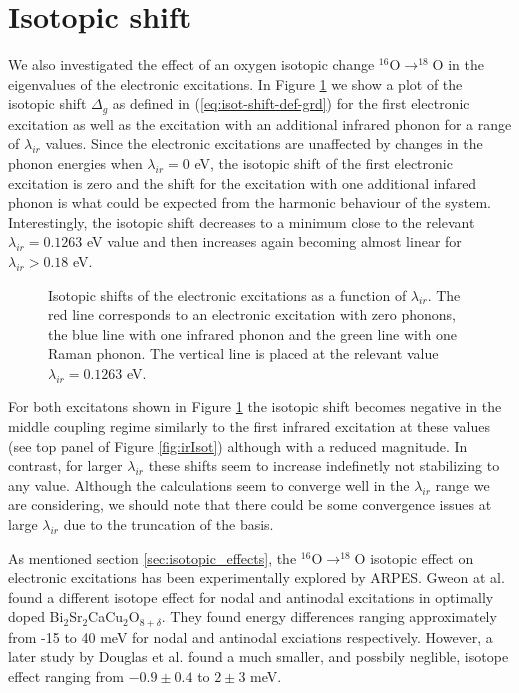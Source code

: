 \section{Isotopic shift}
\label{sec:elIsotShift}

We also investigated the effect of an oxygen isotopic change $^{16}$O$\rightarrow ^{18}$O in the eigenvalues of the electronic excitations.
In Figure \ref{fig:electrIsot} we show a plot of the isotopic shift $\Delta_g$ as defined in (\ref{eq:isot-shift-def-grd}) for the first electronic excitation as well as the excitation with an additional infrared phonon for a range of $\lambda_{ir}$ values.
Since the electronic excitations are unaffected by changes in the phonon energies when $\lambda_{ir}=0$ eV, the isotopic shift of the first electronic excitation is zero and the shift for the excitation with one additional infared phonon is what could be expected from the harmonic behaviour of the system.
Interestingly, the isotopic shift decreases to a minimum close to the relevant $\lambda_{ir}=0.1263$ eV value and then increases again becoming almost linear for $\lambda_{ir}>0.18$ eV.
%
\begin{figure}[ht]
  \centering
  
  \caption[Isotopic shift of the electronic excitations as a function of $\lambda_{ir}$.]
  {Isotopic shifts of the electronic excitations as a function of $\lambda_{ir}$. 
    The red line corresponds to an electronic excitation with zero phonons, the blue line with one infrared phonon and the green line with one Raman phonon.
    The vertical line is placed at the relevant value $\lambda_{ir}=0.1263$ eV.}
  \label{fig:electrIsot}
\end{figure}

For both excitatons shown in Figure \ref{fig:electrIsot} the isotopic shift becomes negative in the middle coupling regime similarly to the first infrared excitation at these values (see top panel of Figure \ref{fig:irIsot}) although with a reduced magnitude.
In contrast, for larger $\lambda_{ir}$ these shifts seem to increase indefinetly not stabilizing to any value.
Although the calculations seem to converge well in the $\lambda_{ir}$ range we are considering, we should note that there could be some convergence issues at large $\lambda_{ir}$ due to the truncation of the basis.

As mentioned section \ref{sec:isotopic_effects}, the $^{16}$O$\rightarrow ^{18}$O isotopic effect on electronic excitations has been experimentally explored by ARPES.
Gweon at al. \cite{Gweon2004} found a different isotope effect for nodal and antinodal excitations in optimally doped Bi$_2$Sr$_2$CaCu$_2$O$_{8+\delta}$. 
They found energy differences ranging approximately from -15 to 40 meV for nodal and antinodal exciations respectively.
However, a later study by Douglas et al. \cite{Douglas2007} found a much smaller, and possbily neglible, isotope effect ranging from $-0.9\pm 0.4$ to $2 \pm 3$ meV.

